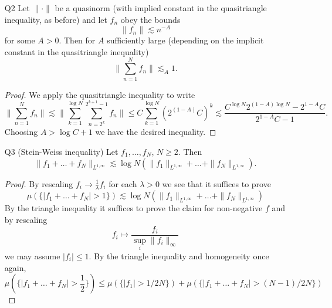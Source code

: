 \documentclass[11pt]{article}
\theoremstyle{remark}
\newcommand{\1}{\textbf{1}}
\newcommand{\lle}{\lesssim}
\def\norm#1{\| #1  \|}
\begin{document}
\begin{enumerate}
\[
\norm{f_n} \lesssim 2^{-\epsilon n}
\]
for some $\epsilon > 0$. Then
\[
\norm{ \sum_{n=1}^N f_n } \lesssim_\epsilon 1 .
\]
\begin{proof}
Let $C$ denote the implied constant in the triangle inequality. Let $K = \log C / \epsilon$. Since
\begin{align*}
\norm{ \sum_{n=1}^N f_n } &\leq C  \norm{ \sum_{n=1}^K f_n } + C^2 \norm{ \sum_{n= K + 1}^{2K} f_n } + \mathellipsis C^{N/K} \norm{ \sum_{n= lK + 1}^N f_n }\\
& \lle C^K \left( C 2^{-\epsilon} + C^2 2^{-K \epsilon} + \mathellipsis + C^{N/K} 2^{- N \epsilon} \right)
\end{align*}
we may assume, without loss of generality, that $\epsilon > \log C$. Then
\[
\norm{ \sum_{n=1}^N f_n } \leq \sum_{n=1}^N \left(\frac{C}{2^\epsilon} \right)^n \lle_\epsilon 1. \qedhere 
\]
\end{proof}
\item[Q2] Let $\| \cdot \|$ be a quasinorm (with implied constant in the quasitriangle inequality, as before) and let $f_n$ obey the bounds
\[
\norm{f_n} \lle n^{-A}
\]
for some $A > 0$. Then for $A$ sufficiently large (depending on the implicit constant in the quasitriangle inequality)
\[
\norm{ \sum_{n=1}^N f_n } \lesssim_A 1 .
\]
\begin{proof}
We apply the quasitriangle inequality to write
\[
\norm{ \sum_{n=1}^N f_n } \lle  \norm{ \sum_{k =1}^ {\log N} \sum_{n=2^k}^{2^{k+1} -1} f_n } \leq C \sum_{k =1}^{\log N} (2^{(1-A)}C)^{k}  \lle \frac{ C^{\log N} 2^{(1-A) \log N} - 2^{1-A} C}{2^{1-A} C - 1}.
\]
Choosing $A > \log C + 1$ we have the desired inequality.
\end{proof}
\item[Q3] (Stein-Weiss inequality) Let $f_1, \ldots, f_N$, $N \geq 2$. Then
\[
\|f_1 + \ldots + f_N \|_{L^{1, \infty}} \lle \log N( \|f_1 \|_{L^{1,\infty}} + \ldots + \|f_N \|_{L^{1,\infty}}).
\]
\begin{proof}
By rescaling $f_i \to \frac{1}{\lambda} f_i$ for each $\lambda > 0$ we see that it suffices to prove
\[
\mu( \{|f_1 + \ldots + f_N| > 1 \} ) \lle \log N( \norm{f_1}_{L^{1,\infty}} + \ldots + \norm{f_N }_{L^{1,\infty}})
\]
By the triangle inequality it suffices to prove the claim for non-negative $f$ and by rescaling 
\[
f_i \mapsto \frac{f_i}{\sup_i \norm{f_i}_\infty}
\]
we may assume $|f_i| \leq 1$. By the triangle inequality and homogeneity once again,
\[
\mu( \{|f_1 + \ldots + f_N| > \frac{1}{2} \} ) \leq \mu( \{|f_1| > 1/2N \} ) + \mu( \{|f_1 + \ldots + f_N| > (N-1)/2N \} )
\]
\end{proof}
\end{enumerate}
\end{document}
